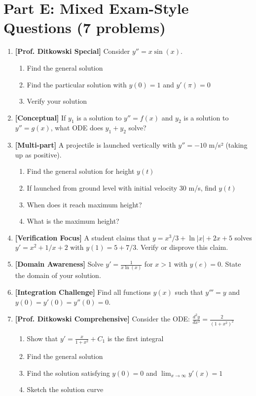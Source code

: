 \documentclass[12pt]{article}
\begin{document}
\section*{Part E: Mixed Exam-Style Questions (7 problems)}

\begin{enumerate}[resume]
\item \textbf{[Prof. Ditkowski Special]} Consider $y'' = x\sin(x)$.
    \begin{enumerate}
        \item Find the general solution
        \item Find the particular solution with $y(0) = 1$ and $y'(\pi) = 0$
        \item Verify your solution
    \end{enumerate}

\item \textbf{[Conceptual]} If $y_1$ is a solution to $y'' = f(x)$ and $y_2$ is a solution to $y'' = g(x)$, what ODE does $y_1 + y_2$ solve?

\item \textbf{[Multi-part]} A projectile is launched vertically with $y'' = -10$ m/s² (taking up as positive).
    \begin{enumerate}
        \item Find the general solution for height $y(t)$
        \item If launched from ground level with initial velocity 30 m/s, find $y(t)$
        \item When does it reach maximum height?
        \item What is the maximum height?
    \end{enumerate}

\item \textbf{[Verification Focus]} A student claims that $y = x^3/3 + \ln|x| + 2x + 5$ solves $y' = x^2 + 1/x + 2$ with $y(1) = 5 + 7/3$. Verify or disprove this claim.

\item \textbf{[Domain Awareness]} Solve $y' = \frac{1}{x\ln(x)}$ for $x > 1$ with $y(e) = 0$. State the domain of your solution.

\item \textbf{[Integration Challenge]} Find all functions $y(x)$ such that $y''' = y$ and $y(0) = y'(0) = y''(0) = 0$.

\item \textbf{[Prof. Ditkowski Comprehensive]}
    Consider the ODE: $\frac{d^2y}{dx^2} = \frac{2}{(1+x^2)^2}$
    \begin{enumerate}
        \item Show that $y' = \frac{x}{1+x^2} + C_1$ is the first integral
        \item Find the general solution
        \item Find the solution satisfying $y(0) = 0$ and $\lim_{x \to \infty} y'(x) = 1$
        \item Sketch the solution curve
    \end{enumerate}
\end{enumerate}
\end{document}
